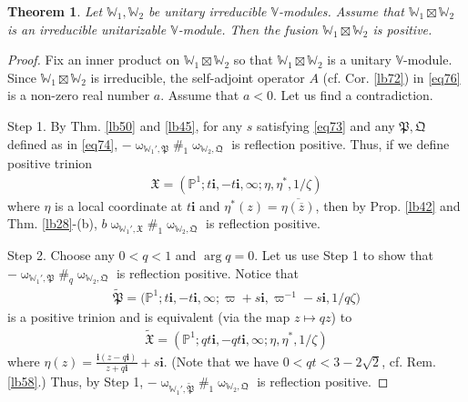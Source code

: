 \documentclass[11pt,b5paper,notitlepage]{article}
\theoremstyle{definition}
\newtheorem{df}{Definition}[section]
\theoremstyle{plain}
\newtheorem{thm}[df]{Theorem}
\newcommand{\fk}{\mathfrak}
\newcommand{\wtd}{\widetilde}
\newcommand{\ovl}{\overline}
\newcommand{\im}{\mathbf{i}}
\newcommand{\Vbb}{\mathbb V}
\newcommand{\Wbb}{\mathbb W}
\newcommand{\Pbb}{\mathbb P}
\numberwithin{equation}{section}
\begin{document}
\begin{comment}
\begin{df}
We say that $\Vbb$ is \textbf{completely unitary} if all irreducible $\Vbb$-modules are unitarizable, and if for each unitary irreducible $\Vbb$-modules $\Wbb_1,\Wbb_2$ the fusion $\Wbb_1\boxtimes \Wbb_2$ is positive.
\end{df}
\end{comment}



\begin{thm}\label{lb60}
Let $\Wbb_1,\Wbb_2$ be unitary irreducible $\Vbb$-modules. Assume that $\Wbb_1\boxtimes\Wbb_2$ is an irreducible unitarizable $\Vbb$-module. Then the fusion $\Wbb_1\boxtimes\Wbb_2$ is positive.
\end{thm}

\begin{proof}
Fix an inner product on $\Wbb_1\boxtimes\Wbb_2$ so that $\Wbb_1\boxtimes\Wbb_2$ is a unitary $\Vbb$-module. Since $\Wbb_1\boxtimes\Wbb_2$ is irreducible, the self-adjoint operator $A$ (cf. Cor. \ref{lb72}) in  \eqref{eq76} is a non-zero real number $a$. Assume that $a<0$. Let us find a contradiction.

Step 1. By Thm. \ref{lb50} and \ref{lb45}, for any $s$ satisfying \eqref{eq73} and any $\fk P,\fk Q$ defined as in \eqref{eq74}, $-\upomega_{\Wbb_1',\fk P}\#_1\upomega_{\Wbb_2,\fk Q}$ is reflection positive. Thus, if we define positive trinion
\begin{align*}
\fk X=(\Pbb^1;t\im,-t\im,\infty;\eta,\eta^*,1/\zeta)
\end{align*}
where $\eta$ is a local coordinate at $t\im$ and $\eta^*(z)=\ovl{\eta(\ovl z)}$, then by Prop. \ref{lb42} and Thm. \ref{lb28}-(b), $b\upomega_{\Wbb_1',\fk X}\#_1\upomega_{\Wbb_2,\fk Q}$ is reflection positive.

Step 2. Choose any $0<q<1$ and $\arg q=0$. Let us use Step 1 to show that $-\upomega_{\Wbb_1',\fk P}\#_q\upomega_{\Wbb_2,\fk Q}$ is reflection positive. Notice that
\begin{align*}
\wtd{\fk P}=\big(\Pbb^1;t\im,-t\im,\infty;\varpi+s\im,\varpi^{-1}-s\im,1/q\zeta\big)
\end{align*}
is a positive trinion and is equivalent (via the map $z\mapsto qz$) to
\begin{align*}
\wtd{\fk X}=(\Pbb^1;qt\im,-qt\im,\infty;\eta,\eta^*,1/\zeta)
\end{align*}
where $\displaystyle\eta(z)=\frac{\im(z-q\im)}{z+q\im}+s\im$. (Note that we have $0<qt<3-2\sqrt 2$, cf. Rem. \ref{lb58}.) Thus, by Step 1, $-\upomega_{\Wbb_1',\wtd{\fk P}}\#_1\upomega_{\Wbb_2,\fk Q}$ is reflection positive.


\end{proof}
\end{document}
